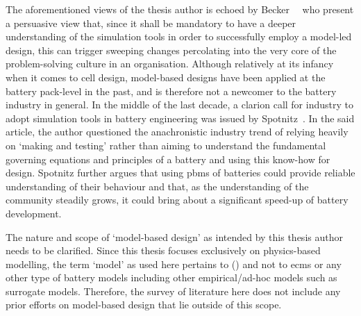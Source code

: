 The   aforementioned    views   of    the   thesis    author   is    echoed   by
Becker~\etal~\cite{Becker2005}  who present  a  persuasive view  that, since  it
shall be  mandatory to have  a deeper understanding  of the simulation  tools in
order  to successfully  employ a  model-led  design, this  can trigger  sweeping
changes percolating  into the  very core  of the  problem-solving culture  in an
organisation. Although relatively  at its infancy when it comes  to cell design,
model-based designs have been applied at the battery pack-level in the past, and
is therefore not a newcomer to the battery industry in general. In the middle of
the  last decade,  a clarion  call  for industry  to adopt  simulation tools  in
battery  engineering was  issued  by Spotnitz~\cite{Spotnitz2005}.  In the  said
article,  the author  questioned  the anachronistic  industry  trend of  relying
heavily on `making and testing' rather than aiming to understand the fundamental
governing equations  and principles  of a  battery and  using this  know-how for
design.  Spotnitz  further argues  that  using  \glspl{pbm} of  batteries  could
provide reliable understanding of their behaviour and that, as the understanding
of the community steadily grows, it  could bring about a significant speed-up of
battery development.

The nature and  scope of `model-based design' as intended  by this thesis author
needs to  be clarified. Since  this thesis focuses exclusively  on physics-based
modelling,  the  term  `model'  as  used  here  pertains  to  
() and not to \glspl{ecm} or any other type of battery models
including other empirical/ad-hoc models such as surrogate models. Therefore, the
survey of  literature here  does not  include any  prior efforts  on model-based
design that lie outside of this scope.

